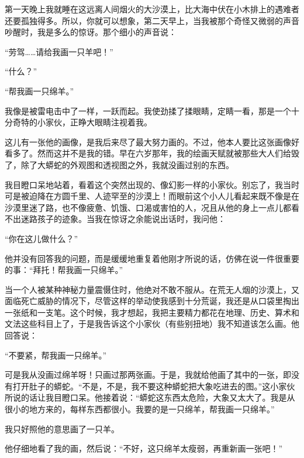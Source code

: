 第一天晚上我就睡在这远离人间烟火的大沙漠上，比大海中伏在小木排上的遇难者还要孤独得多。所以，你就可以想象，第二天早上，当我被那个奇怪又微弱的声音吵醒时，我是多么的惊讶。那个细小的声音说：

{\startalignment[center]
 \stopalignment}

“劳驾\ldots{}\ldots{}请给我画一只羊吧！”

“什么？”

“帮我画一只绵羊。”

我像是被雷电击中了一样，一跃而起。我使劲揉了揉眼睛，定睛一看，那是一个十分奇特的小家伙，正睁大眼睛注视着我。

这儿有一张他的画像，是我后来尽了最大努力画的。不过，他本人要比这张画像好看多了。然而这并不是我的错。早在六岁那年，我的绘画天赋就被那些大人们给毁了，除了大蟒蛇的外观图和透视图之外，我就没画过别的东西。

我目瞪口呆地站着，看着这个突然出现的、像幻影一样的小家伙。别忘了，我当时可是被迫降在方圆千里、人迹罕至的沙漠上！而眼前这个小人儿看起来既不像是在沙漠里迷了路，也不像疲惫、饥饿、口渴或害怕的人，况且从他的身上一点儿都看不出迷路孩子的迹象。当我在惊讶之余能说出话时，我问他：

“你在这儿做什么？”

他并没有回答我的问题，而是缓缓地重复着他刚才所说的话，仿佛在说一件很重要的事：“拜托！帮我画一只绵羊。”

当一个人被某种神秘力量震慑住时，他绝对不敢不服从。在荒无人烟的沙漠上，又面临死亡威胁的情况下，尽管这样的举动使我感到十分荒诞，我还是从口袋里掏出一张纸和一支笔。这个时候，我才想起，我把主要精力都花在地理、历史、算术和文法这些科目上了，于是我告诉这个小家伙（有些别扭地）我不知道该怎么画。他回答说：

“不要紧，帮我画一只绵羊。”

可是我从没画过绵羊呀！只画过那两张画。于是，我就给他画了其中的一张，即没有打开肚子的蟒蛇。“不是，不是，我不要这种蟒蛇把大象吃进去的图。”这小家伙所说的话让我目瞪口呆。他接着说：“蟒蛇这东西太危险，大象又太大了。我是从很小的地方来的，每样东西都很小。我要的是一只绵羊，帮我画一只绵羊。”

我只好照他的意思画了一只羊。

他仔细地看了我的画，然后说：“不好，这只绵羊太瘦弱，再重新画一张吧！”

{\startalignment[center]
 \stopalignment}

